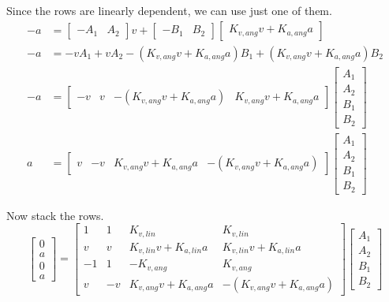 Since the rows are linearly dependent, we can use just one of them.
\begin{align*}
  -a &=
    \begin{bmatrix}
      -A_1 & A_2
    \end{bmatrix} v +
    \begin{bmatrix}
      -B_1 & B_2
    \end{bmatrix}
    \begin{bmatrix}
      K_{v,ang} v + K_{a,ang} a
    \end{bmatrix} \\
  -a &= -v A_1 + v A_2 - (K_{v,ang} v + K_{a,ang} a) B_1 + (K_{v,ang} v + K_{a,ang} a) B_2 \\
  -a &=
    \begin{bmatrix}
      -v & v & -(K_{v,ang} v + K_{a,ang} a) & K_{v,ang} v+ K_{a,ang} a
    \end{bmatrix}
    \begin{bmatrix}
      A_1 \\
      A_2 \\
      B_1 \\
      B_2
    \end{bmatrix} \\
  a &=
    \begin{bmatrix}
      v & -v & K_{v,ang} v + K_{a,ang} a & -(K_{v,ang} v + K_{a,ang} a)
    \end{bmatrix}
    \begin{bmatrix}
      A_1 \\
      A_2 \\
      B_1 \\
      B_2
    \end{bmatrix}
\end{align*}

Now stack the rows.
\begin{equation*}
  \begin{bmatrix}
    0 \\
    a \\
    0 \\
    a
  \end{bmatrix} =
  \begin{bmatrix}
    1 & 1 & K_{v,lin} & K_{v,lin} \\
    v & v & K_{v,lin} v + K_{a,lin} a & K_{v,lin} v + K_{a,lin} a \\
    -1 & 1 & -K_{v,ang} & K_{v,ang} \\
    v & -v & K_{v,ang} v + K_{a,ang} a & -(K_{v,ang} v + K_{a,ang} a)
  \end{bmatrix}
  \begin{bmatrix}
    A_1 \\
    A_2 \\
    B_1 \\
    B_2
  \end{bmatrix}
\end{equation*}

